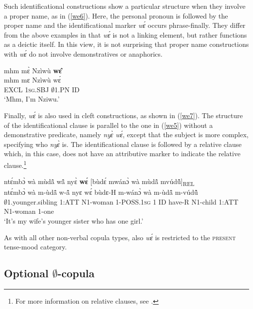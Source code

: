 Such identificational constructions show a particular structure when they involve a proper name, as in (\ref{we6}). Here, the personal pronoun is followed by the proper name and the identificational marker {\itshape wɛ́} occurs phrase-finally. They differ from the above examples in that {\itshape wɛ́} is not a linking element, but rather functions as a deictic itself. In this view, it is not surprising that proper name constructions with {\itshape wɛ́} do not involve demonstratives or anaphorics. 

\begin{exe} 
\ex\label{we6} 
  \glll  mhm mɛ̀ Nzìwù {\bfseries wɛ̂} \\
         mhm mɛ Nzìwù wɛ́ \\
       EXCL 1\textsc{sg}.SBJ $\emptyset$1.PN  ID  \\
    \trans `Mhm, I'm Nziwu.'
\end{exe}


Finally, {\itshape wɛ́} is also used in cleft constructions, as shown in (\ref{we7}). The structure of the identificational clause is parallel to the one in (\ref{we5}) without a demonstrative predicate, namely {\itshape nyɛ̀ wɛ́}, except that the subject is more complex, specifying who {\itshape nyɛ̀} is. The identificational clause is  followed by a relative clause which, in this case, does not have an attributive marker to indicate the relative clause.\footnote{For more information on relative clauses, see .}


\begin{exe} 
\ex\label{we7} 
  \glll ntɛ́mbɔ̀ wà mùdã̂ wã̂ nyɛ̀ {\bfseries wɛ́} [bùdɛ́ mwánɔ̀ wà mùdã̂ mvúdũ̂]\textsubscript{REL} \\
       ntɛ́mbɔ̀ wà m-ùdã̂ w-ã̂ nyɛ wɛ́ bùdɛ-H m-wánɔ̀ wà m-ùdã̂ m-vúdũ̂ \\
        $\emptyset$1.younger.sibling 1:ATT N1-woman 1-POSS.1\textsc{sg} 1 ID have-R N1-child 1:ATT N1-woman 1-one    \\
    \trans `It's my wife's younger sister who has one girl.'
\end{exe}

\noindent As with all other non-verbal copula types, also {\itshape wɛ́} is restricted to the \textsc{present} tense-mood category.



\subsection{Optional $\emptyset$-copula}
\label{sec:0COP}

